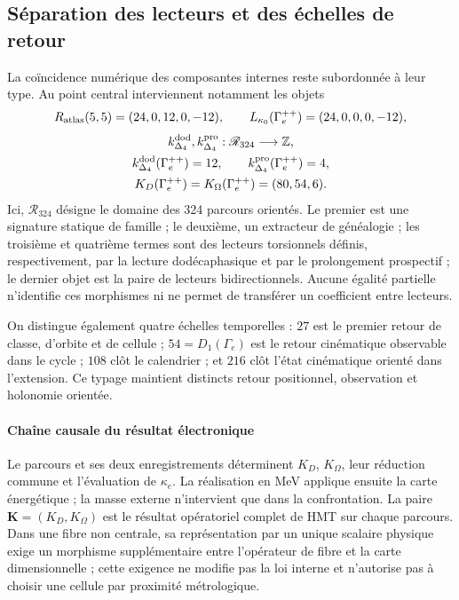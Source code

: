 \subsection{Séparation des lecteurs et des échelles de retour}

La coïncidence numérique des composantes internes reste subordonnée à leur
type. Au point central interviennent notamment les objets
\[
 R_{\rm atlas}(5,5)=(24,0,12,0,-12),
 \qquad
 L_{\kappa_0}(\Gamma_e^{++})=(24,0,0,0,-12),
\]
\[
 \begin{gathered}
 k_{\Delta_4}^{\rm dod},k_{\Delta_4}^{\rm pro}:
 \mathscr R_{324}\longrightarrow\mathbb Z,\\
 k_{\Delta_4}^{\rm dod}(\Gamma_e^{++})=12,
 \qquad
 k_{\Delta_4}^{\rm pro}(\Gamma_e^{++})=4,\\
 K_D(\Gamma_e^{++})=K_\Omega(\Gamma_e^{++})=(80,54,6).
 \end{gathered}
\]
Ici, \(\mathscr R_{324}\) désigne le domaine des 324 parcours orientés.
Le premier est une signature statique de famille ; le deuxième, un extracteur de
généalogie ; les troisième et quatrième termes sont des lecteurs torsionnels définis,
respectivement, par la lecture dodécaphasique et par le prolongement prospectif ;
le dernier objet est la paire de lecteurs bidirectionnels. Aucune égalité
partielle n'identifie ces morphismes ni ne permet de transférer un coefficient entre
lecteurs.

On distingue également quatre échelles temporelles : \(27\) est le premier retour
de classe, d'orbite et de cellule ; \(54=D_1(\Gamma_e)\) est le retour cinématique
observable dans le cycle ; \(108\) clôt le calendrier ; et \(216\) clôt l'état cinématique
orienté dans l'extension. Ce typage maintient distincts retour
positionnel, observation et holonomie orientée.

\paragraph{Chaîne causale du résultat électronique}
Le parcours et ses deux enregistrements déterminent \(K_D\), \(K_\Omega\), leur réduction
commune et l'évaluation de \(\kappa_e\). La réalisation en MeV applique ensuite
la carte énergétique ; la masse externe n'intervient que dans la confrontation. La paire
\(\mathbf K=(K_D,K_\Omega)\) est le résultat opératoriel complet de HMT sur
chaque parcours. Dans une fibre non centrale, sa représentation par un unique scalaire
physique exige un morphisme supplémentaire entre l'opérateur de fibre et la carte
dimensionnelle ; cette exigence ne modifie pas la loi interne et n'autorise pas à choisir
une cellule par proximité métrologique.
